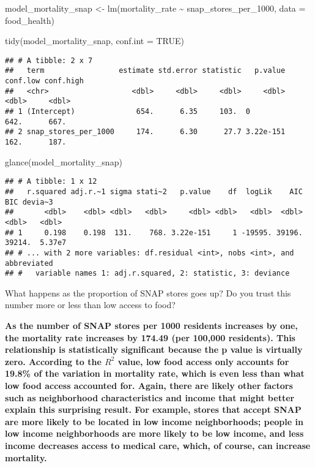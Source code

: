 \documentclass[
]{article}
\newenvironment{Shaded}{\begin{snugshade}}{\end{snugshade}}
\newcommand{\AttributeTok}[1]{\textcolor[rgb]{0.77,0.63,0.00}{#1}}
\newcommand{\ConstantTok}[1]{\textcolor[rgb]{0.00,0.00,0.00}{#1}}
\newcommand{\FunctionTok}[1]{\textcolor[rgb]{0.00,0.00,0.00}{#1}}
\newcommand{\NormalTok}[1]{#1}
\newcommand{\OtherTok}[1]{\textcolor[rgb]{0.56,0.35,0.01}{#1}}
\newcommand{\SpecialCharTok}[1]{\textcolor[rgb]{0.00,0.00,0.00}{#1}}
\begin{document}
\begin{Shaded}
\begin{Highlighting}[]
\NormalTok{model\_mortality\_snap }\OtherTok{\textless{}{-}} \FunctionTok{lm}\NormalTok{(mortality\_rate }\SpecialCharTok{\textasciitilde{}}\NormalTok{ snap\_stores\_per\_1000,}
                           \AttributeTok{data =}\NormalTok{ food\_health)}

\FunctionTok{tidy}\NormalTok{(model\_mortality\_snap, }\AttributeTok{conf.int =} \ConstantTok{TRUE}\NormalTok{)}
\end{Highlighting}
\end{Shaded}

\begin{verbatim}
## # A tibble: 2 x 7
##   term                 estimate std.error statistic   p.value conf.low conf.high
##   <chr>                   <dbl>     <dbl>     <dbl>     <dbl>    <dbl>     <dbl>
## 1 (Intercept)              654.      6.35     103.  0             642.      667.
## 2 snap_stores_per_1000     174.      6.30      27.7 3.22e-151     162.      187.
\end{verbatim}

\begin{Shaded}
\begin{Highlighting}[]
\FunctionTok{glance}\NormalTok{(model\_mortality\_snap)}
\end{Highlighting}
\end{Shaded}

\begin{verbatim}
## # A tibble: 1 x 12
##   r.squared adj.r.~1 sigma stati~2   p.value    df  logLik    AIC    BIC devia~3
##       <dbl>    <dbl> <dbl>   <dbl>     <dbl> <dbl>   <dbl>  <dbl>  <dbl>   <dbl>
## 1     0.198    0.198  131.    768. 3.22e-151     1 -19595. 39196. 39214.  5.37e7
## # ... with 2 more variables: df.residual <int>, nobs <int>, and abbreviated
## #   variable names 1: adj.r.squared, 2: statistic, 3: deviance
\end{verbatim}

What happens as the proportion of SNAP stores goes up? Do you trust this
number more or less than low access to food?

\textbf{As the number of SNAP stores per 1000 residents increases by
one, the mortality rate increases by 174.49 (per 100,000 residents).
This relationship is statistically significant because the p value is
virtually zero. According to the \(R^2\) value, low food access only
accounts for 19.8\% of the variation in mortality rate, which is even
less than what low food access accounted for. Again, there are likely
other factors such as neighborhood characteristics and income that might
better explain this surprising result. For example, stores that accept
SNAP are more likely to be located in low income neighborhoods; people
in low income neighborhoods are more likely to be low income, and less
income decreases access to medical care, which, of course, can increase
mortality.}
\end{document}
